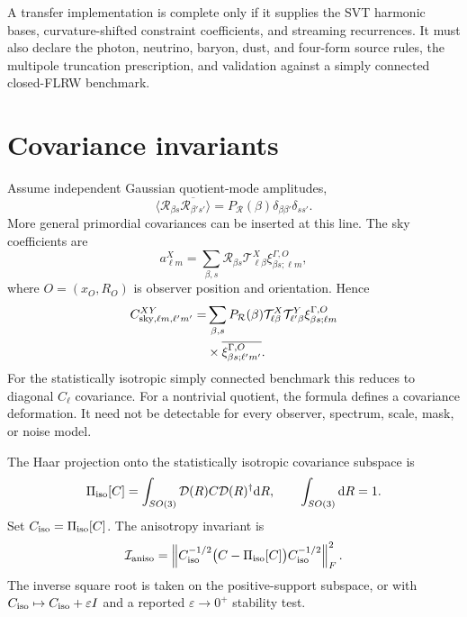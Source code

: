 \documentclass[
  aps,
  prd,
  reprint,
  superscriptaddress,
  floatfix,
  nofootinbib,
  longbibliography
]{revtex4-2}
\theoremstyle{plain}
\theoremstyle{definition}
\theoremstyle{remark}
\newcommand{\dd}{\mathrm d}
\newcommand{\Rcl}{\mathcal R}
\newcommand{\Tcal}{\mathcal T}
\newcommand{\Ical}{\mathcal I}
\begin{document}
A transfer implementation is complete only if it supplies the SVT harmonic bases, curvature-shifted constraint coefficients, and streaming recurrences.  It must also declare the photon, neutrino, baryon, dust, and four-form source rules, the multipole truncation prescription, and validation against a simply connected closed-FLRW benchmark.

\section{Covariance invariants}

Assume independent Gaussian quotient-mode amplitudes,
\begin{equation}
\langle\Rcl_{\beta s}\overline{\Rcl_{\beta's'}}\rangle
=P_{\Rcl}(\beta)\delta_{\beta\beta'}\delta_{ss'}.
\end{equation}
More general primordial covariances can be inserted at this line.  The sky coefficients are
\begin{equation}
a_{\ell m}^X=\sum_{\beta,s}\Rcl_{\beta s}\Tcal_{\ell\beta}^{X}\xi_{\beta s;\ell m}^{\Gamma,O},
\end{equation}
where $O=(x_O,R_O)$ is observer position and orientation.  Hence
\begin{equation}
\begin{aligned}
C_{{\rm sky},\ell m,\ell'm'}^{XY}
=&\sum_{\beta,s}P_{\Rcl}(\beta)
\Tcal_{\ell\beta}^{X}\Tcal_{\ell'\beta}^{Y}
\xi_{\beta s;\ell m}^{\Gamma,O}\nonumber\\
&\times\overline{\xi_{\beta s;\ell'm'}^{\Gamma,O}}.
\end{aligned}
\label{eq:sky_covariance}
\end{equation}
For the statistically isotropic simply connected benchmark this reduces to diagonal $C_\ell$ covariance.  For a nontrivial quotient, the formula defines a covariance deformation.  It need not be detectable for every observer, spectrum, scale, mask, or noise model.

The Haar projection onto the statistically isotropic covariance subspace is
\begin{equation}
\Pi_{\rm iso}[C]=\int_{SO(3)}\mathcal D(R)C\mathcal D(R)^\dagger\dd R,
\qquad
\int_{SO(3)}\dd R=1.
\label{eq:Haar}
\end{equation}
Set $C_{\rm iso}=\Pi_{\rm iso}[C]$.  The anisotropy invariant is
\begin{equation}
\Ical_{\rm aniso}=\left\|
C_{\rm iso}^{-1/2}\bigl(C-\Pi_{\rm iso}[C]\bigr)
C_{\rm iso}^{-1/2}\right\|_F^2.
\label{eq:anisotropy_invariant}
\end{equation}
The inverse square root is taken on the positive-support subspace, or with $C_{\rm iso}\mapsto C_{\rm iso}+\varepsilon I$ and a reported $\varepsilon\to0^+$ stability test.
\end{document}
